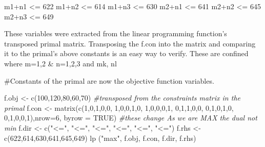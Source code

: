 \documentclass[
]{article}
\newenvironment{Shaded}{\begin{snugshade}}{\end{snugshade}}
\newcommand{\AttributeTok}[1]{\textcolor[rgb]{0.77,0.63,0.00}{#1}}
\newcommand{\CommentTok}[1]{\textcolor[rgb]{0.56,0.35,0.01}{\textit{#1}}}
\newcommand{\ConstantTok}[1]{\textcolor[rgb]{0.00,0.00,0.00}{#1}}
\newcommand{\DecValTok}[1]{\textcolor[rgb]{0.00,0.00,0.81}{#1}}
\newcommand{\FunctionTok}[1]{\textcolor[rgb]{0.00,0.00,0.00}{#1}}
\newcommand{\NormalTok}[1]{#1}
\newcommand{\OtherTok}[1]{\textcolor[rgb]{0.56,0.35,0.01}{#1}}
\newcommand{\StringTok}[1]{\textcolor[rgb]{0.31,0.60,0.02}{#1}}
\begin{document}
m1+n1 \textless= 622 m1+n2 \textless= 614 m1+n3 \textless= 630 m2+n1
\textless= 641 m2+n2 \textless= 645 m2+n3 \textless= 649

These variables were extracted from the linear programming function's
transposed primal matrix. Transposing the f.con into the matrix and
comparing it to the primal's above constants is an easy way to verify.
These are confined where m=1,2 \& n=1,2,3 and mk, nl

\#Constants of the primal are now the objective function variables.

\begin{Shaded}
\begin{Highlighting}[]
\NormalTok{ f.obj }\OtherTok{\textless{}{-}} \FunctionTok{c}\NormalTok{(}\DecValTok{100}\NormalTok{,}\DecValTok{120}\NormalTok{,}\DecValTok{80}\NormalTok{,}\DecValTok{60}\NormalTok{,}\DecValTok{70}\NormalTok{)}
 \CommentTok{\#transposed from the constraints matrix in the primal}
\NormalTok{ f.con }\OtherTok{\textless{}{-}} \FunctionTok{matrix}\NormalTok{(}\FunctionTok{c}\NormalTok{(}\DecValTok{1}\NormalTok{,}\DecValTok{0}\NormalTok{,}\DecValTok{1}\NormalTok{,}\DecValTok{0}\NormalTok{,}\DecValTok{0}\NormalTok{,}
                   \DecValTok{1}\NormalTok{,}\DecValTok{0}\NormalTok{,}\DecValTok{0}\NormalTok{,}\DecValTok{1}\NormalTok{,}\DecValTok{0}\NormalTok{,}
                   \DecValTok{1}\NormalTok{,}\DecValTok{0}\NormalTok{,}\DecValTok{0}\NormalTok{,}\DecValTok{0}\NormalTok{,}\DecValTok{1}\NormalTok{,}
                   \DecValTok{0}\NormalTok{,}\DecValTok{1}\NormalTok{,}\DecValTok{1}\NormalTok{,}\DecValTok{0}\NormalTok{,}\DecValTok{0}\NormalTok{,}
                   \DecValTok{0}\NormalTok{,}\DecValTok{1}\NormalTok{,}\DecValTok{0}\NormalTok{,}\DecValTok{1}\NormalTok{,}\DecValTok{0}\NormalTok{,}
                   \DecValTok{0}\NormalTok{,}\DecValTok{1}\NormalTok{,}\DecValTok{0}\NormalTok{,}\DecValTok{0}\NormalTok{,}\DecValTok{1}\NormalTok{),}\AttributeTok{nrow=}\DecValTok{6}\NormalTok{, }\AttributeTok{byrow =} \ConstantTok{TRUE}\NormalTok{)}
 \CommentTok{\#these change As we are MAX the dual not min}
\NormalTok{ f.dir }\OtherTok{\textless{}{-}} \FunctionTok{c}\NormalTok{(}\StringTok{"\textless{}="}\NormalTok{,}
 \StringTok{"\textless{}="}\NormalTok{,}
 \StringTok{"\textless{}="}\NormalTok{,}
 \StringTok{"\textless{}="}\NormalTok{,}
\StringTok{"\textless{}="}\NormalTok{, }\StringTok{"\textless{}="}\NormalTok{)}
\NormalTok{ f.rhs }\OtherTok{\textless{}{-}} \FunctionTok{c}\NormalTok{(}\DecValTok{622}\NormalTok{,}\DecValTok{614}\NormalTok{,}\DecValTok{630}\NormalTok{,}\DecValTok{641}\NormalTok{,}\DecValTok{645}\NormalTok{,}\DecValTok{649}\NormalTok{)}
 \FunctionTok{lp}\NormalTok{ (}\StringTok{"max"}\NormalTok{, f.obj, f.con, f.dir, f.rhs)}
\end{Highlighting}
\end{Shaded}
\end{document}
